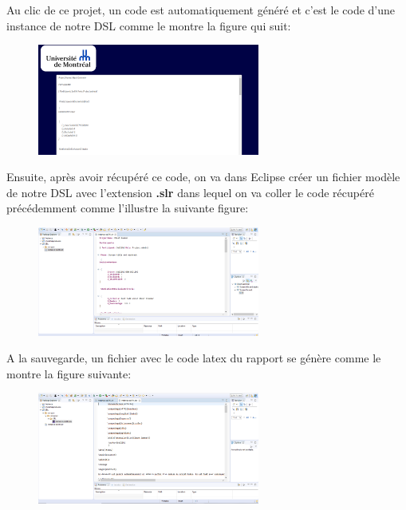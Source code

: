 \vspace*{4mm}

Au clic de ce projet, un code est automatiquement généré et c'est le code d'une instance de notre DSL comme le montre la figure qui suit:

\begin{figure}[H]
        \centering
        \includegraphics[width=0.65\textwidth]{resources/images/exemple2.PNG}
\end{figure}

\newpage

Ensuite, après avoir récupéré ce code, on va dans Eclipse créer un fichier modèle de notre DSL avec l'extension \textbf{.slr} dans lequel on va coller le code récupéré précédemment comme l'illustre la suivante figure:

\begin{figure}[H]
        \centering
        \includegraphics[width=0.65\textwidth]{resources/images/exemple3.PNG}
\end{figure}

A la sauvegarde, un fichier avec le code latex du rapport se génère comme le montre la figure suivante:

\begin{figure}[H]
        \centering
        \includegraphics[width=0.65\textwidth]{resources/images/exemple4.PNG}
\end{figure}

